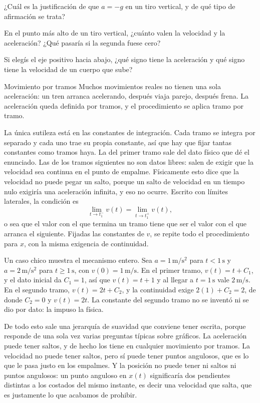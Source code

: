 \documentclass[11pt,openany]{book}
\begin{document}
\begin{chequeo}
\item ¿Cuál es la justificación de que $a=-g$ en un tiro vertical, y de qué tipo de afirmación se trata?
\item En el punto más alto de un tiro vertical, ¿cuánto valen la velocidad y la aceleración? ¿Qué pasaría si la segunda fuese cero?
\item Si elegís el eje positivo hacia abajo, ¿qué signo tiene la aceleración y qué signo tiene la velocidad de un cuerpo que sube?
\end{chequeo}

\begin{bloque}{Movimiento por tramos}
Muchos movimientos reales no tienen una sola aceleración: un tren arranca acelerando, después viaja parejo, después frena. La aceleración queda definida por tramos, y el procedimiento se aplica tramo por tramo.

La única sutileza está en las constantes de integración. Cada tramo se integra por separado y cada uno trae su propia constante, así que hay que fijar tantas constantes como tramos haya. La del primer tramo sale del dato físico que dé el enunciado. Las de los tramos siguientes no son datos libres: salen de exigir que la velocidad sea continua en el punto de empalme. Físicamente esto dice que la velocidad no puede pegar un salto, porque un salto de velocidad en un tiempo nulo exigiría una aceleración infinita, y eso no ocurre. Escrito con límites laterales, la condición es
\[
\lim_{t\to t_1^{-}} v(t) = \lim_{t\to t_1^{+}} v(t),
\]
o sea que el valor con el que termina un tramo tiene que ser el valor con el que arranca el siguiente. Fijadas las constantes de $v$, se repite todo el procedimiento para $x$, con la misma exigencia de continuidad.

Un caso chico muestra el mecanismo entero. Sea $a = 1\,\mathrm{m/s^2}$ para $t<1\,\mathrm{s}$ y $a=2\,\mathrm{m/s^2}$ para $t\ge 1\,\mathrm{s}$, con $v(0)=1\,\mathrm{m/s}$. En el primer tramo, $v(t) = t + C_1$, y el dato inicial da $C_1 = 1$, así que $v(t) = t+1$ y al llegar a $t=1\,\mathrm{s}$ vale $2\,\mathrm{m/s}$. En el segundo tramo, $v(t) = 2t + C_2$, y la continuidad exige $2(1)+C_2 = 2$, de donde $C_2 = 0$ y $v(t)=2t$. La constante del segundo tramo no se inventó ni se dio por dato: la impuso la física.

De todo esto sale una jerarquía de suavidad que conviene tener escrita, porque responde de una sola vez varias preguntas típicas sobre gráficos. La aceleración puede tener saltos, y de hecho los tiene en cualquier movimiento por tramos. La velocidad no puede tener saltos, pero sí puede tener puntos angulosos, que es lo que le pasa justo en los empalmes. Y la posición no puede tener ni saltos ni puntos angulosos: un punto anguloso en $x(t)$ significaría dos pendientes distintas a los costados del mismo instante, es decir una velocidad que salta, que es justamente lo que acabamos de prohibir.


\end{bloque}
\end{document}
